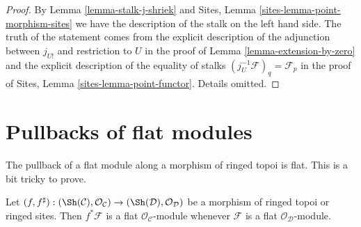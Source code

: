 \begin{proof}
By Lemma \ref{lemma-stalk-j-shriek} and
Sites, Lemma \ref{sites-lemma-point-morphism-sites}
we have the description of the stalk on the left hand side.
The truth of the statement comes from the explicit
description of the adjunction between $j_{U!}$ and restriction to $U$
in the proof of Lemma \ref{lemma-extension-by-zero} and the explicit
description of the equality of stalks $(j_U^{-1}\mathcal{F})_q = \mathcal{F}_p$
in the proof of Sites, Lemma \ref{sites-lemma-point-functor}.
Details omitted.
\end{proof}











\section{Pullbacks of flat modules}
\label{section-pullback-flat}

\noindent
The pullback of a flat module along a morphism of ringed topoi is flat.
This is a bit tricky to prove.

\begin{lemma}
\label{lemma-pullback-flat}
\begin{reference}
\cite[Expos\'e V, Corollary 1.7.1]{SGA4}
\end{reference}
Let
$(f, f^\sharp) :
(\Sh(\mathcal{C}), \mathcal{O}_\mathcal{C})
\to
(\Sh(\mathcal{D}), \mathcal{O}_\mathcal{D})$
be a morphism of ringed topoi or ringed sites.
Then $f^*\mathcal{F}$ is a flat $\mathcal{O}_\mathcal{C}$-module
whenever $\mathcal{F}$ is a flat $\mathcal{O}_\mathcal{D}$-module.
\end{lemma}

